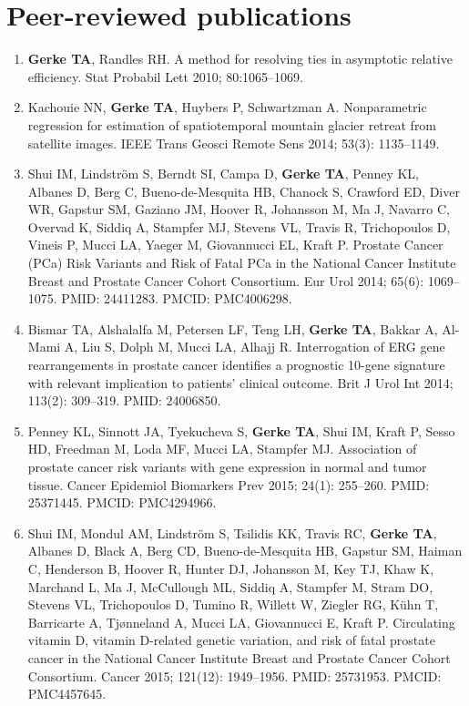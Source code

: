 \documentclass[11pt, a4paper]{article} %
\begin{document}
\section*{Peer-reviewed publications}
\begin{enumerate}[leftmargin=*]
\item{} {\bf Gerke TA}, Randles RH. A method for resolving ties in asymptotic relative efficiency.
Stat Probabil Lett 2010; 80:1065--1069.

\item{} Kachouie NN, {\bf Gerke TA}, Huybers P, Schwartzman A. Nonparametric regression for estimation of spatiotemporal mountain glacier retreat from satellite images. IEEE Trans Geosci Remote Sens 2014; 53(3): 1135--1149.

\item{} Shui IM, Lindstr\"{o}m S, Berndt SI, Campa D, {\bf Gerke TA}, Penney KL, Albanes D, Berg C, Bueno-de-Mesquita HB, Chanock S, Crawford ED, Diver WR, Gapstur SM, Gaziano JM, Hoover R, Johansson M, Ma J, Navarro C, Overvad K, Siddiq A, Stampfer MJ, Stevens VL, Travis R, Trichopoulos D, Vineis P, Mucci LA, Yaeger M, Giovannucci EL, Kraft P. Prostate Cancer (PCa) Risk Variants and Risk of Fatal PCa in the National Cancer Institute Breast and Prostate Cancer Cohort Consortium. Eur Urol 2014; 65(6): 1069--1075. PMID: 24411283. PMCID: PMC4006298.

\item{} Bismar TA, Alshalalfa M, Petersen LF, Teng LH, {\bf Gerke TA}, Bakkar A, Al-Mami A, Liu S, Dolph M, Mucci LA, Alhajj R. Interrogation of ERG gene rearrangements in prostate cancer identifies a prognostic 10-gene signature with relevant implication to patients' clinical outcome. Brit J Urol Int 2014; 113(2): 309--319. PMID: 24006850.

\item{} Penney KL, Sinnott JA, Tyekucheva S, {\bf Gerke TA}, Shui IM, Kraft P, Sesso HD, Freedman M, Loda MF, Mucci LA, Stampfer MJ. Association of prostate cancer risk variants with gene expression in normal and tumor tissue. Cancer Epidemiol Biomarkers Prev 2015; 24(1): 255--260. PMID: 25371445. PMCID: PMC4294966.

\item{} Shui IM, Mondul AM, Lindstr\"{o}m S, Tsilidis KK, Travis RC, {\bf Gerke TA}, Albanes D, Black A, Berg CD, Bueno-de-Mesquita HB, Gapstur SM, Haiman C, Henderson B, Hoover R, Hunter DJ, Johansson M, Key TJ, Khaw K, Marchand L, Ma J, McCullough ML, Siddiq A, Stampfer M, Stram DO, Stevens VL, Trichopoulos D, Tumino R, Willett W, Ziegler RG, K\"{u}hn T, Barricarte A, Tj\o nneland A, Mucci LA, Giovannucci E, Kraft P. Circulating vitamin D, vitamin D-related genetic variation, and risk of fatal prostate cancer in the National Cancer Institute Breast and Prostate Cancer Cohort Consortium. Cancer 2015; 121(12): 1949--1956. PMID: 25731953. PMCID: PMC4457645.


\end{enumerate}
\end{document}
